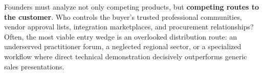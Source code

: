 Founders must analyze not only competing products, but \textbf{competing routes to the customer}. Who controls the buyer's trusted professional communities, vendor approval lists, integration marketplaces, and procurement relationships? Often, the most viable entry wedge is an overlooked distribution route: an underserved practitioner forum, a neglected regional sector, or a specialized workflow where direct technical demonstration decisively outperforms generic sales presentations.
